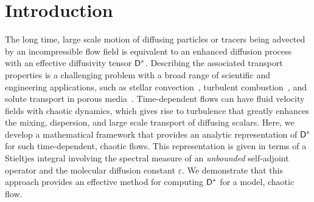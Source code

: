 \documentclass[amsa]{ipart}
\begin{document}
\section{Introduction}\label{sec:Introduction}
The long time, large scale motion of diffusing particles or tracers
being advected by an incompressible flow field is equivalent to an
enhanced diffusion process~\cite{Taylor:PRSL:196} with an effective
diffusivity tensor $\mathsf{D}^*$. Describing the associated 
transport properties is a challenging problem with a broad range of
scientific and engineering applications, such as stellar
convection~\cite{Knobloch:1992ApJ,Press:1981:ApJ,canut98,canut98b,canut00},
turbulent
combustion~\cite{Aslanyan:BF00790149,Bilger:05:10.1016,Tabaczynski:1990:243,Williams:1985:TC:9781611971064,Peters:2000:TC:9780521660822,Xin:2009:Fronts:9780387876832},
and solute transport in porous
media~\cite{Bhattacharya:AAP:1999:951,Bhattacharya:1989:ASD,Whitaker:AIC690130308,Gupta:WRCR3940,Koch:1988:965,Lester:PRL:111.174101,Koch:JFM:7961001}.
Time-dependent flows can have fluid velocity fields with chaotic
dynamics, which gives rise to turbulence that greatly enhances the
mixing, dispersion, and large scale transport of diffusing
scalars. Here, we develop a mathematical framework that provides an
analytic representation of $\mathsf{D}^*$ for such time-dependent, chaotic
flows. This representation is given in terms of a Stieltjes integral
involving the spectral measure of an \emph{unbounded} self-adjoint
operator and the molecular diffusion constant $\varepsilon$. We demonstrate that
this approach provides an effective method for computing $\mathsf{D}^*$ for a
model, chaotic flow.  
\end{document}
